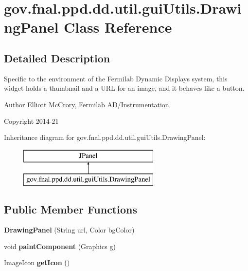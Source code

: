 \hypertarget{classgov_1_1fnal_1_1ppd_1_1dd_1_1util_1_1guiUtils_1_1DrawingPanel}{\section{gov.\-fnal.\-ppd.\-dd.\-util.\-gui\-Utils.\-Drawing\-Panel Class Reference}
\label{classgov_1_1fnal_1_1ppd_1_1dd_1_1util_1_1guiUtils_1_1DrawingPanel}
}


\subsection{Detailed Description}
Specific to the environment of the Fermilab Dynamic Displays system, this widget holds a thumbnail and a U\-R\-L for an image, and it behaves like a button.

\begin{DoxyAuthor}{Author}
Elliott Mc\-Crory, Fermilab A\-D/\-Instrumentation 
\end{DoxyAuthor}
\begin{DoxyCopyright}{Copyright}
2014-\/21 
\end{DoxyCopyright}
Inheritance diagram for gov.\-fnal.\-ppd.\-dd.\-util.\-gui\-Utils.\-Drawing\-Panel\-:\begin{figure}[H]
\begin{center}
\leavevmode
\includegraphics[height=2.000000cm]{classgov_1_1fnal_1_1ppd_1_1dd_1_1util_1_1guiUtils_1_1DrawingPanel}
\end{center}
\end{figure}
\subsection*{Public Member Functions}
\begin{DoxyCompactItemize}
\item 
\hypertarget{classgov_1_1fnal_1_1ppd_1_1dd_1_1util_1_1guiUtils_1_1DrawingPanel_a1584ddf035e111b02180a19949642966}{{\bfseries Drawing\-Panel} (String url, Color bg\-Color)}\label{classgov_1_1fnal_1_1ppd_1_1dd_1_1util_1_1guiUtils_1_1DrawingPanel_a1584ddf035e111b02180a19949642966}

\item 
\hypertarget{classgov_1_1fnal_1_1ppd_1_1dd_1_1util_1_1guiUtils_1_1DrawingPanel_ad854d2575bc2020948d871306f0d44c0}{void {\bfseries paint\-Component} (Graphics g)}\label{classgov_1_1fnal_1_1ppd_1_1dd_1_1util_1_1guiUtils_1_1DrawingPanel_ad854d2575bc2020948d871306f0d44c0}

\item 
\hypertarget{classgov_1_1fnal_1_1ppd_1_1dd_1_1util_1_1guiUtils_1_1DrawingPanel_ad2f449ee150fda74537d48b529a4467c}{Image\-Icon {\bfseries get\-Icon} ()}\label{classgov_1_1fnal_1_1ppd_1_1dd_1_1util_1_1guiUtils_1_1DrawingPanel_ad2f449ee150fda74537d48b529a4467c}

\end{DoxyCompactItemize}


